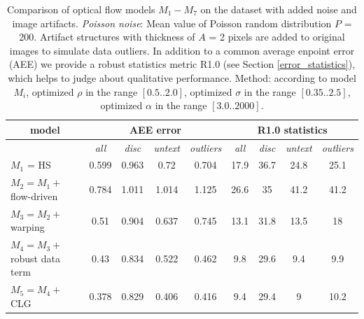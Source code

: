 \begin{table}[ht] \scriptsize
  \centering
  \caption{Comparison of optical flow models $M_1 - M_7$ on the \rub dataset with added noise and image artifacts. \textit{Poisson noise}: Mean value of Poisson random distribution $P$ = 200. Artifact structures with thickness of  $A$ = 2 pixels are added to original images to simulate data outliers. In addition to a common average enpoint error (AEE) we provide a robust statistics metric R1.0 (see Section \ref{error_statistics}), which helps to judge about qualitative performance. Method: according to model $M_i$, optimized $\rho$ in the range $[0.5 .. 2.0]$, optimized $\sigma$ in the range $[0.35 .. 2.5]$, optimized $\alpha$ in the range $[3.0 .. 2000]$.}
    \begin{tabular}{rcrrrcrrr}
    \toprule
    \multicolumn{1}{c}{model} & \multicolumn{4}{c}{AEE error} & \multicolumn{4}{c}{R1.0 statistics} \\
    \midrule
          & \textit{all} & \multicolumn{1}{c}{\textit{disc}} & \multicolumn{1}{c}{\textit{untext}} & \multicolumn{1}{c}{\textit{outliers}} & \textit{all} & \multicolumn{1}{c}{\textit{disc}} & \multicolumn{1}{c}{\textit{untext}} & \multicolumn{1}{c}{\textit{outliers}} \\
          \midrule
          \midrule
    \multicolumn{1}{l}{$M_1$ = HS} & 0.599 & \multicolumn{1}{c}{0.963} & \multicolumn{1}{c}{0.72} & \multicolumn{1}{c}{0.704} & 17.9  & \multicolumn{1}{c}{36.7} & \multicolumn{1}{c}{24.8} & \multicolumn{1}{c}{25.1} \\
    \multicolumn{1}{l}{$M_2 = M_1 + $ flow-driven} & 0.784 & \multicolumn{1}{c}{1.011} & \multicolumn{1}{c}{1.014} & \multicolumn{1}{c}{1.125} & 26.6  & \multicolumn{1}{c}{35} & \multicolumn{1}{c}{41.2} & \multicolumn{1}{c}{41.2} \\
    \multicolumn{1}{l}{$M_3 = M_2 + $ warping} & 0.51  & \multicolumn{1}{c}{0.904} & \multicolumn{1}{c}{0.637} & \multicolumn{1}{c}{0.745} & 13.1  & \multicolumn{1}{c}{31.8} & \multicolumn{1}{c}{13.5} & \multicolumn{1}{c}{18} \\
    \multicolumn{1}{l}{$M_4 = M_3 + $ robust data term} & 0.43  & \multicolumn{1}{c}{0.834} & \multicolumn{1}{c}{0.522} & \multicolumn{1}{c}{0.462} & 9.8   & \multicolumn{1}{c}{29.6} & \multicolumn{1}{c}{9.4} & \multicolumn{1}{c}{9.9} \\
    \multicolumn{1}{l}{$M_5 = M_4 + $ CLG} & 0.378 & \multicolumn{1}{c}{0.829} & \multicolumn{1}{c}{0.406} & \multicolumn{1}{c}{0.416} & 9.4   & \multicolumn{1}{c}{29.4} & \multicolumn{1}{c}{9} & \multicolumn{1}{c}{10.2} \\

\end{tabular}
\end{table}
